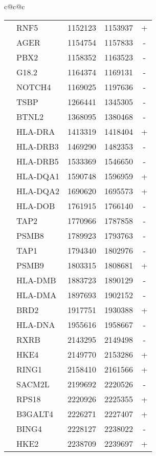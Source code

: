 \begin{tabular}{c@{\quad}c@{\quad}c}
\begin{tabular}[t]{|r|lrrc|}
         & RNF5       &  1152123 &  1153937 & + \\
         & AGER       &  1154754 &  1157833 & - \\
         & PBX2       &  1158352 &  1163523 & - \\
         & G18.2      &  1164374 &  1169131 & - \\
         & NOTCH4     &  1169025 &  1197636 & - \\
         & TSBP       &  1266441 &  1345305 & - \\
         & BTNL2      &  1368095 &  1380468 & - \\
         & HLA-DRA    &  1413319 &  1418404 & + \\
         & HLA-DRB3   &  1469290 &  1482353 & - \\
         & HLA-DRB5   &  1533369 &  1546650 & - \\
         & HLA-DQA1   &  1590748 &  1596959 & + \\
         & HLA-DQA2   &  1690620 &  1695573 & + \\
         & HLA-DOB    &  1761915 &  1766140 & - \\
         & TAP2       &  1770966 &  1787858 & - \\
         & PSMB8      &  1789923 &  1793763 & - \\
         & TAP1       &  1794340 &  1802976 & - \\
         & PSMB9      &  1803315 &  1808681 & + \\
         & HLA-DMB    &  1883723 &  1890129 & - \\
         & HLA-DMA    &  1897693 &  1902152 & - \\
         & BRD2       &  1917751 &  1930388 & + \\
         & HLA-DNA    &  1955616 &  1958667 & - \\
         & RXRB       &  2143295 &  2149498 & - \\
         & HKE4       &  2149770 &  2153286 & + \\
         & RING1      &  2158410 &  2161566 & + \\
         & SACM2L     &  2199692 &  2220526 & - \\
         & RPS18      &  2220926 &  2225355 & + \\
         & B3GALT4    &  2226271 &  2227407 & + \\
         & BING4      &  2228127 &  2238022 & - \\
         & HKE2       &  2238709 &  2239697 & + \\

\end{tabular}
\end{tabular}
